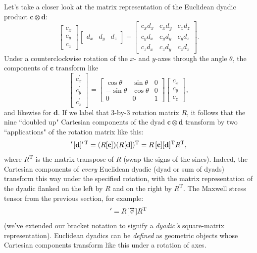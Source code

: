 \documentclass[12pt]{article}
\renewcommand{\vv}[1]{\mathbf{#1}}
\newcommand{\tightoverset}[2]{%
  \mathop{#2}\limits^{\vbox to -.5ex{\kern-0.75ex\hbox{$#1$}\vss}}}
\newcommand{\inlinedy}[1]{\tightoverset{\text{\tiny$\bm\leftrightarrow$}}{#1}}
\begin{document}
Let's take a closer look at the matrix representation of the Euclidean dyadic product $\vv c \otimes \vv d$:
\begin{equation*}
\begin{bmatrix}
c_x \\
c_y \\
c_z
\end{bmatrix}
\begin{bmatrix}
d_x & d_y & d_z
\end{bmatrix}
=
\begin{bmatrix}
c_x d_x & c_x d_y & c_x d_z \\
c_y d_x & c_y d_y & c_y d_z \\
c_z d_x & c_z d_y & c_z d_z 
\end{bmatrix} .
\end{equation*}
Under a counterclockwise rotation of the $x$- and $y$-axes through the angle $\theta$, the components of $\vv c$ transform like
\begin{equation*}
\begin{bmatrix}
c_x^\prime \\[1pt]
c_y^\prime \\[1pt]
c_z^\prime
\end{bmatrix}
=
\begin{bmatrix}
\cos \theta & \sin \theta & 0 \\
- \sin \theta & \cos \theta & 0 \\
0 & 0 & 1 
\end{bmatrix}
\begin{bmatrix}
c_x \\
c_y \\
c_z
\end{bmatrix} ,
\end{equation*}
and likewise for $\vv d$. If we label that 3-by-3 rotation matrix $R$, it follows that the nine ``doubled up" Cartesian components of the dyad $\vv c \otimes \vv d$ transform by two ``applications" of the rotation matrix like this:
\begin{equation*}
[\vv c ]^\prime \mkern2mu [\vv d ]^{\prime \, \mathrm{T}} = ( R [\vv c] ) ( R [\vv d] )^\mathrm{T} = R \, [\vv c] [\vv d]^{\mathrm{T}} R^{\mathrm{T}} ,
\end{equation*}
where $R^{\mathrm{T}}$ is the matrix transpose of $R$ (swap the signs of the sines). Indeed, the Cartesian components of \emph{every} Euclidean dyadic (dyad or sum of dyads) transform this way under the specified rotation, with the matrix representation of the dyadic flanked on the left by $R$ and on the right by $R^{\mathrm{T}}$. The Maxwell stress tensor from the previous section, for example:
\begin{equation*}
[ \mkern1.5mu {\inlinedy{\upsigma}} \mkern1.5mu ]^{\prime} = R \mkern1mu [\mkern1.5mu \inlinedy{\upsigma} \mkern1.5mu] R^{\mathrm{T}}
\end{equation*}
(we've extended our bracket notation to signify a \emph{dyadic's} square-matrix representation). Euclidean dyadics can be \emph{defined} as geometric objects whose Cartesian components transform like this under a rotation of axes.
\end{document}
